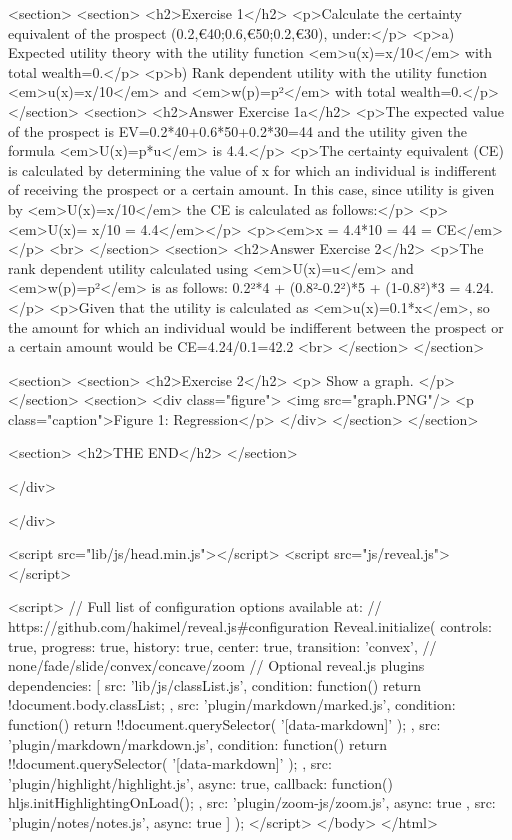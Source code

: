 				<section>
					<section>
						<h2>Exercise 1</h2>
						<p>Calculate the certainty equivalent of the prospect (0.2,€40;0.6,€50;0.2,€30), under:</p>
						<p>a) Expected utility theory with the utility function <em>u(x)=x/10</em> with total wealth=0.</p>
						<p>b) Rank dependent utility with the utility function <em>u(x)=x/10</em> and <em>w(p)=p²</em> with total wealth=0.</p>
					</section>
					<section>
						<h2>Answer Exercise 1a</h2>
						<p>The expected value of the prospect is EV=0.2*40+0.6*50+0.2*30=44 and the utility given the formula <em>U(x)=\sum p*u</em> is 4.4.</p>
						<p>The certainty equivalent (CE) is calculated by determining the value of x for which an individual is indifferent of receiving the prospect or a certain amount. In this case, since utility is given by <em>U(x)=x/10</em> the CE is calculated as follows:</p>
						<p><em>U(x)= x/10 = 4.4</em></p>
						<p><em>x = 4.4*10 = 44 = CE</em></p>
						<br>
					</section>
					<section>
						<h2>Answer Exercise 2</h2>
						<p>The rank dependent utility calculated using <em>U(x)=\sum \pi*u</em> and <em>w(p)=p²</em> is as follows: 0.2²*4 + (0.8²-0.2²)*5 + (1-0.8²)*3 = 4.24.</p>
						<p>Given that the utility is calculated as <em>u(x)=0.1*x</em>, so the amount for which an individual would be indifferent between the prospect or a certain amount would be CE=4.24/0.1=42.2
						<br>
					</section>
				</section>

				<section>
					<section>
						<h2>Exercise 2</h2>
						<p>
							Show a graph.
						</p>
					</section>
					<section>
						<div class="figure">
							<img src="graph.PNG"/>
							<p class="caption">Figure 1: Regression</p>
						</div>
					</section>
				</section>
				
				<section>
					<h2>THE END</h2>
				</section>
	
			</div>

		</div>

		<script src="lib/js/head.min.js"></script>
		<script src="js/reveal.js"></script>

		<script>
			// Full list of configuration options available at:
			// https://github.com/hakimel/reveal.js#configuration
			Reveal.initialize({
				controls: true,
				progress: true,
				history: true,
				center: true,
				transition: 'convex', // none/fade/slide/convex/concave/zoom
				// Optional reveal.js plugins
				dependencies: [
					{ src: 'lib/js/classList.js', condition: function() { return !document.body.classList; } },
					{ src: 'plugin/markdown/marked.js', condition: function() { return !!document.querySelector( '[data-markdown]' ); } },
					{ src: 'plugin/markdown/markdown.js', condition: function() { return !!document.querySelector( '[data-markdown]' ); } },
					{ src: 'plugin/highlight/highlight.js', async: true, callback: function() { hljs.initHighlightingOnLoad(); } },
					{ src: 'plugin/zoom-js/zoom.js', async: true },
					{ src: 'plugin/notes/notes.js', async: true }
				]
			});
		</script>
	</body>
</html>
